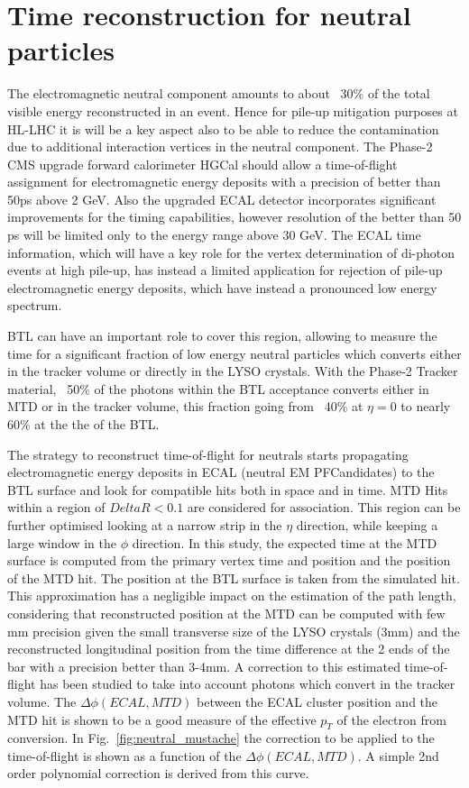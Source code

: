 \section{Time reconstruction for neutral particles}
The electromagnetic neutral component amounts to about ~30\% of the total visible energy reconstructed in an event.
Hence for pile-up mitigation purposes at HL-LHC it is will be a key aspect also to be able to reduce the contamination due to additional interaction vertices in the neutral component.
The Phase-2 CMS upgrade forward calorimeter HGCal should allow a time-of-flight assignment for electromagnetic energy deposits with a precision of better than 50ps above 2 GeV. Also the upgraded ECAL detector incorporates significant improvements for the timing capabilities, however resolution of the better than 50 ps will be limited only to the energy range above 30 GeV. The ECAL time information, which will have a key role for the vertex determination of di-photon events at high pile-up, has instead a limited application for rejection of pile-up electromagnetic energy deposits, which have instead a pronounced low energy spectrum.

BTL can have an important role to cover this region, allowing to measure the time for a significant fraction of low energy neutral particles which converts either in the tracker volume or directly in the LYSO crystals. With the Phase-2 Tracker material, ~50\% of the photons within the BTL acceptance converts either in MTD or in the tracker volume, this fraction going from ~40\% at $\eta=0$ to nearly 60\% at the the of the BTL.

The strategy to reconstruct time-of-flight for neutrals starts propagating electromagnetic energy deposits in ECAL (neutral EM PFCandidates) to the BTL surface and look for compatible hits both in space and in time. MTD Hits within a region of $Delta R<0.1$ are considered for association. This region can be further optimised looking at a narrow strip in the $\eta$ direction, while keeping a large window in the $\phi$ direction.
In this study, the expected time at the MTD surface is computed from the primary vertex time and position and the position of the MTD hit. The position at the BTL surface is taken from the simulated hit. This approximation has a negligible impact on the estimation of the path length, considering that reconstructed position at the MTD can be computed with few mm precision given the small transverse size of the LYSO crystals (3mm) and the reconstructed longitudinal position from the time difference at the 2 ends of the bar  with a precision better than 3-4mm. A correction to this estimated time-of-flight has been studied to take into account photons which convert in the tracker volume. The $\Delta\phi(ECAL,MTD)$ between the ECAL cluster position and the MTD hit is shown to be a good measure of the effective $p_{T}$ of the electron from conversion. In Fig.~\ref{fig:neutral_mustache} the correction to be applied to the time-of-flight is shown as a function of the $\Delta\phi(ECAL,MTD)$. A simple 2nd order polynomial correction is derived from this curve.

